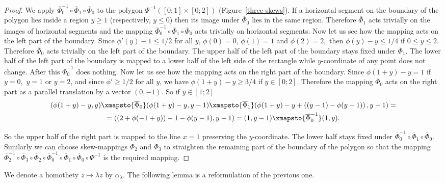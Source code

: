 \documentclass[12pt]{article}
\theoremstyle{definition}
\begin{document}
\begin{proof}
We apply $\overline\Phi_0^{-1}\circ\overline\Phi_1\circ\overline\Phi_0$ to the polygon $\Psi^{-1}([0;1]\times[0;2])$ (Figure~\ref{three-skews}). If a horizontal segment on the boundary of the polygon lies inside a region $y\ge 1$ (respectively, $y\le 0$) then its image under $\overline\Phi_0$ lies in the same region. Therefore $\overline\Phi_1$ acts trivially on the images of horizontal segments and the mapping $\overline\Phi_0^{-1}\circ\overline\Phi_1\circ\overline\Phi_0$ acts trivially on horizontal segments. Now let us see how the mapping acts on the left part of the boundary. Since $\phi'(y) - 1 \le 1/2$ for all $y$, $\phi(0) = 0$, $\phi(1) = 1$ and $\phi(2)=2,$ then $\phi(y) - y\le 1/4$ if $0\le y\le 2.$ Therefore $\overline\Phi_0$ acts trivially on the left part of the boundary. The upper half of the left part of the boundary stays fixed under $\overline\Phi_1$. The lower half of the left part of the boundary is mapped to a lower half of the left side of the rectangle while $y$-coordinate of any point does not change. After this $\overline\Phi_0^{-1}$ does nothing. Now let us see how the mapping acts on the right part of the boundary. Since $\phi(1+y) - y=1$ if $y=0,$ $y=1$ or $y=2$, and since $\phi' \ge 1/2$ for all $y$, we have $\phi(1+y)-y\ge3/4$ if $y\in[0;2].$ Therefore the mapping $\overline\Phi_0$ acts on the right part as a parallel translation by a vector $(0,-1).$ So if $y\in[1;2]$
\begin{multline*}
(\phi(1+y) - y, y) \xmapsto{\overline\Phi_0} (\phi(1+y) - y, y - 1) \xmapsto{\overline\Phi_1} (\phi(1+y) - y + \left((y-1) - \phi(y-1)\right), y-1) = \\
= ( \left(2 + \phi(-1 + y)\right) - 1 - \phi(y-1), y-1 ) = (1,y-1) \xmapsto{\overline\Phi_0^{-1}}
(1,y).
\end{multline*}

So the upper half of the right part is mapped to the line $x = 1$ preserving the $y$-coordinate. The lower half stays fixed under $\overline\Phi_0^{-1}\circ\overline\Phi_1\circ\overline\Phi_0$. Similarly we can choose skew-mappings $\overline \Phi_2$ and $\overline \Phi_3$ to straighten the remaining part of the boundary of the polygon so that the mapping $\overline\Phi_2^{-1}\circ\overline\Phi_3\circ\overline\Phi_2\circ\overline\Phi_0^{-1}\circ\overline\Phi_1\circ\overline\Phi_0\circ\Psi^{-1}$ is the required mapping.
\end{proof}

We denote a homothety $z\mapsto \lambda z$ by $\alpha_{\lambda}.$ The following lemma is a reformulation of the previous one.
\end{document}
